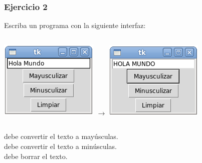 \documentclass[12pt]{beamer}
\begin{document}
  \begin{frame}
    \frametitle{Ejercicio 2}
    Escriba un programa con la siguiente interfaz: \\
    \vfill

    \begin{columns}
        \includegraphics[width=\textwidth]{programas/tkinter/capturas/07-0.png}
        \(\longrightarrow\)
        \includegraphics[width=\textwidth]{programas/tkinter/capturas/07-1.png}
    \end{columns}

   \vfill
    debe convertir el texto a mayúsculas. \\
    debe convertir el texto a minúsculas. \\
    debe borrar el texto.
  \end{frame}
\end{document}
